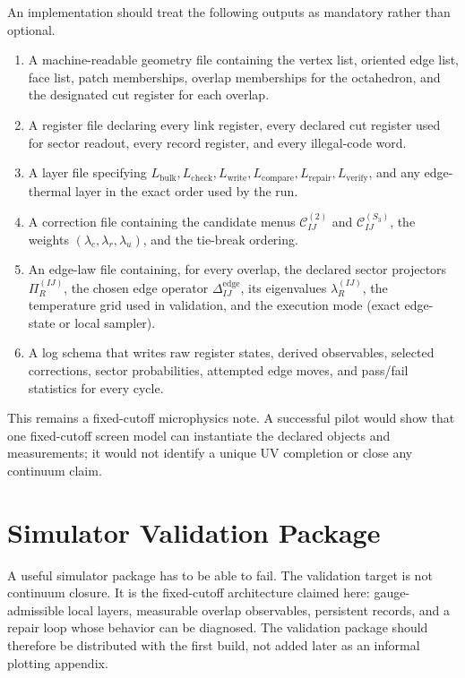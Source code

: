 \documentclass[11pt]{article}
\begin{document}
An implementation should treat the following outputs as mandatory rather than
optional.
\begin{enumerate}[leftmargin=2em]
\item A machine-readable geometry file containing the vertex list, oriented edge list, face list,
patch memberships, overlap memberships for the octahedron, and the designated cut register for
each overlap.
\item A register file declaring every link register, every declared cut register used for sector
readout, every record register, and every illegal-code word.
\item A layer file specifying $L_{\mathrm{bulk}},L_{\mathrm{check}},L_{\mathrm{write}},
L_{\mathrm{compare}},L_{\mathrm{repair}},L_{\mathrm{verify}}$, and any edge-thermal layer in the
exact order used by the run.
\item A correction file containing the candidate menus $\mathcal C_{IJ}^{(2)}$ and
$\mathcal C_{IJ}^{(S_3)}$, the weights $(\lambda_c,\lambda_r,\lambda_u)$, and the tie-break
ordering.
\item An edge-law file containing, for every overlap, the declared sector projectors
$\Pi_R^{(IJ)}$, the chosen edge operator $\Delta_{IJ}^{\mathrm{edge}}$, its eigenvalues
$\lambda_R^{(IJ)}$, the temperature grid used in validation, and the execution mode (exact
edge-state or local sampler).
\item A log schema that writes raw register states, derived observables, selected corrections,
sector probabilities, attempted edge moves, and pass/fail statistics for every cycle.
\end{enumerate}

This remains a fixed-cutoff microphysics note. A successful pilot would show that one fixed-cutoff
screen model can instantiate the declared objects and measurements; it would not identify a
unique UV completion or close any continuum claim.

\section{Simulator Validation Package}

A useful simulator package has to be able to fail. The validation target is not
continuum closure. It is the fixed-cutoff architecture claimed here: gauge-admissible
local layers, measurable overlap observables, persistent records, and a repair loop whose
behavior can be diagnosed. The validation package should therefore be distributed with the first
build, not added later as an informal plotting appendix.
\end{document}
